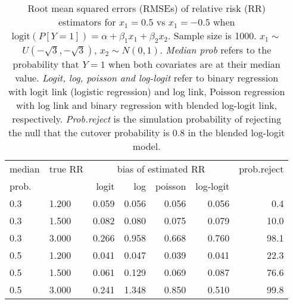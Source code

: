 \documentclass[12pt,a4paper]{article}
\begin{document}
\begin{table}[H] 
\small\sf\centering 
\caption{Root mean squared errors (RMSEs) of relative risk (RR) estimators for $x_1=0.5$ vs $x_1=-0.5$ when $\mbox{logit}(P[Y=1])=\alpha+\beta_1 x_1 + \beta_2 x_2$. Sample size is 1000. $x_1 \sim $$U(-\sqrt{3},-\sqrt{3})$, $x_2 \sim N(0,1)$. {\it Median prob} refers to the probability that $Y=1$ when both covariates are at their median value. {\it Logit, log, poisson and log-logit} refer to binary regression with logit link (logistic regression) and log link, Poisson regression with log link and binary regression with blended log-logit link, respectively. {\it Prob.reject} is the simulation probability of rejecting the null that the cutover probability is $0.8$ in the blended log-logit model.} 
\begin{tabular}{llrrrrr} 
\toprule 
median & true RR & \multicolumn{4}{c}{bias of estimated RR} & prob.reject \\ 
prob. & & logit & log & poisson & log-logit  & \\ \midrule 
0.3 & 1.200 & 0.059 & 0.056 & 0.056 & 0.056 &  0.4 \\  
0.3 & 1.500 & 0.082 & 0.080 & 0.075 & 0.079 & 10.0 \\  
0.3 & 3.000 & 0.266 & 0.958 & 0.668 & 0.760 & 98.1 \\  
0.5 & 1.200 & 0.041 & 0.047 & 0.039 & 0.041 & 22.3 \\  
0.5 & 1.500 & 0.061 & 0.129 & 0.069 & 0.087 & 76.6 \\  
0.5 & 3.000 & 0.241 & 1.348 & 0.850 & 0.510 & 99.8 \\  
\bottomrule 
\end{tabular} 
\end{table} 
\end{document}
